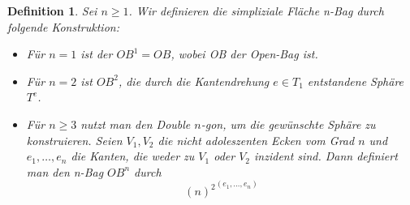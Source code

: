 \documentclass[12pt,titlepage,twoside,cleardoublepage]{article}
\theoremstyle{nummermitklammern}
\newtheorem{definition}[temp]{Definition}
\newtheorem{definition}[zahl]{Definition}
\numberwithin{equation}{section}
\begin{document}
\begin{definition}
Sei $n\geq 1$. Wir definieren die simpliziale Fläche n-Bag durch folgende Konstruktion:
\begin{itemize}
\item Für $n=1$ ist der $OB^1=OB$, wobei OB der Open-Bag ist.
\item Für $n=2$ ist $OB^2$, die durch die Kantendrehung $e\in T_1$ entstandene Sphäre $T^e$.
\item Für $n\geq 3$ nutzt man den Double $n$-gon, um die gewünschte Sphäre zu konstruieren. Seien $V_1,V_2$ die nicht adoleszenten Ecken vom Grad $n$ und $e_1,\ldots, e_n$ die Kanten, die weder zu $V_1$ oder $V_2$ inzident sind. Dann definiert man den n-Bag $OB^n$ durch
\[
{(n)^2}^{(e_1,\ldots,e_n)}
\]
\end{itemize}
\begin{comment}
Sei $(OB^i,$ nun für $i\in \{2,\ldots,n-1\}$ konstruiert. Dann definiert man $OB^{i+1}$ wie folgt:
Man schaut sich zunächst die simpliziale Fläche $(X,<)$ mit
\begin{align*}
X_0:=OB^i_0 \cup Y_0\\
X_1:=OB^i_1\cup Y_1\\
X_2:=OB^i_2 \cup Y_2,
\end{align*}
wobei $Y$ eine simpliziale Fläche ist, die isomorph zum Open-Bag ist und $Y \cap OB^i=\emptyset $ erfüllt. Sei $(e_1,e_2)$ der 2-Waist in $Y\subset X$ 
mit zugehörigen Knoten $V_1,V_2 \in Y_0\subset X_0$ und $e=\{ e',e''\}\in OB^i_1\subset X_1$ eine Kante mit $X_1(e)=\{V,V'\}$ und $3 \notin \{deg_X(V),deg_X(V')\}$.
Man führt nun folgende Mender und Mutteroperationen durch:
\begin{enumerate}
\item Man wendet den Krater Cut $W:=C^C_{\{e',e''\}}(X)$ an und erhält die Kanten $e',e''\in W_1$ mit 
\begin{align*}
W_0(e') = W_0(e'')=\{V_1,V_2\}
\end{align*}
\item Durch den Split Mender entstehen die simpliziale Fläche  $Z:=S^m_{(V_1,e_1),(V,e')}(W)$, in der die Knoten $\{V_1,V\},\{V_2,V'\}$ und Kante $\{e_1,e'\}$ folgende Inzidenzen erfüllen:
\begin{align*}
Z_0(\{e_1,e'\}) = Z_0(e_2) = Z_0(e'')=\{\{V_1,V\},\{V_2,V'\}\}
\end{align*}
\item Schlussendlich gilt in $OB^{i+1}:=C^m_{e_2,e''}(Z)$, dass
\[
OB^{i+1}_0(\{e_1,e'\})=OB^{i+1}_0(\{e_2,e''\})=\{\{V_1,V\},\{V_2,V'\}\}
\]
ist.
\end{enumerate}
\end{comment}
\end{definition}
\end{document}
